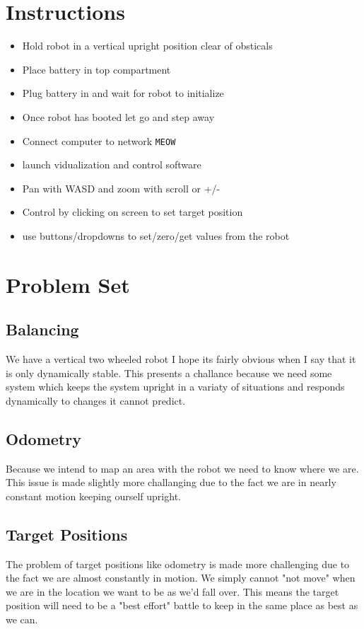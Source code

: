 \documentclass[12pt]{article}
\begin{document}
\section{Instructions}
\begin{itemize}
	\item Hold robot in a vertical upright position clear of obsticals
	\item Place battery in top compartment
	\item Plug battery in and wait for robot to initialize
	\item Once robot has booted let go and step away
	\item Connect computer to network \texttt{MEOW}
	\item launch vidualization and control software
	\item Pan with WASD and zoom with scroll or +/-
	\item Control by clicking on screen to set target position
	\item use buttons/dropdowns to set/zero/get values from the robot
\end{itemize}

\section{Problem Set}

\subsection{Balancing}
We have a vertical two wheeled robot I hope its fairly obvious when I say that it is only dynamically stable. This presents a challance because we need some system which keeps the system upright in a variaty of situations and responds dynamically to changes it cannot predict.
\subsection{Odometry}
Because we intend to map an area with the robot we need to know where we are. This issue is made slightly more challanging due to the fact we are in nearly constant motion keeping ourself upright.
\subsection{Target Positions}
The problem of target positions like odometry is made more challenging due to the fact we are almost constantly in motion. We simply cannot "not move" when we are in the location we want to be as we'd fall over. This means the target position will need to be a "best effort" battle to keep in the same place as best as we can.
\end{document}
